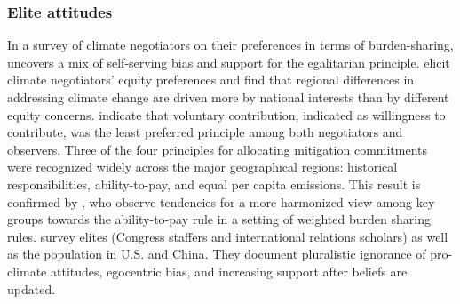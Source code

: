 \subsubsection{Elite attitudes}\label{subsubsec:literature_beliefs} %

In a survey of climate negotiators on their preferences in terms of burden-sharing, \citet{lange_importance_2007} uncovers a mix of self-serving bias and support for the egalitarian principle. \citet{dannenberg_equity_2010} elicit climate negotiators' equity preferences and find that regional differences in addressing climate change are driven more by national interests than by different equity concerns. \citet{hjerpe_common_2011} indicate that voluntary contribution, indicated as willingness to contribute, was the least preferred principle among both negotiators and observers. Three of the four principles for allocating mitigation commitments were recognized widely across the major geographical regions: historical responsibilities, ability-to-pay, and equal per capita emissions. This result is confirmed by \citet{kesternich_negotiating_2021}, who observe tendencies for a more harmonized view among key groups towards the ability-to-pay rule in a setting of weighted burden sharing rules. \citet{mildenberger_beliefs_2019} survey elites (Congress staffers and international relations scholars) as well as the population in U.S. and China. They document pluralistic ignorance of pro-climate attitudes, egocentric bias, and increasing support after beliefs are updated. 

